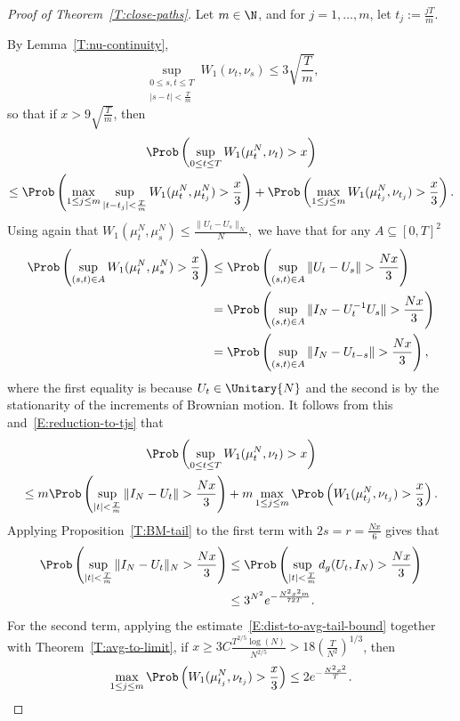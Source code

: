 \begin{proof}[Proof of Theorem~\ref{T:close-paths}]
Let $m\in\N$, and for $j=1,\ldots,m$, let $t_j:=\frac{jT}{m}$.



By Lemma~\ref{T:nu-continuity},
\[
\sup_{\substack{0\le s,t\le T\\
|s-t|<\frac{T}{m}}}W_1(\nu_t,\nu_s)\le 3\sqrt{\frac{T}{m}},
\]
so that if $x>9\sqrt{\frac{T}{m}}$, then
\begin{multline}\label{E:reduction-to-tjs}
\Prob\left(\sup_{0\le t\le T}W_1(\mu^N_t,\nu_t)>x\right)\\
\le \Prob\left(\max_{1\le j\le m}\sup_{|t-t_j|<\frac{T}{m}}W_1(\mu^N_t,\mu^N_{t_j})>\frac{x}{3}\right)+\Prob\left(\max_{1\le j\le m}W_1(\mu^N_{t_j},\nu_{t_j})>\frac{x}{3}\right).
\end{multline}
Using again that $W_1(\mu^N_t,\mu^N_s)\le\frac{\|U_t-U_s\|_N}{N},$ we have that for any $A\subseteq[0,T]^2$
\begin{align*}
\Prob\left(\sup_{(s,t)\in A}W_1(\mu^N_t,\mu^N_s)>\frac{x}{3}\right) &\le\Prob\left(\sup_{(s,t)\in A}\|U_t-U_s\|>\frac{Nx}{3}\right)\\
&=\Prob\left(\sup_{(s,t)\in A}\|I_N-U_t^{-1}U_s\|>\frac{Nx}{3}\right) \\
&=\Prob\left(\sup_{(s,t)\in A}\|I_N-U_{t-s}\|>\frac{Nx}{3}\right),
\end{align*}
where the first equality is because $U_t\in\Unitary{N}$ and the second is by the stationarity of the increments of Brownian motion. It follows from this and~\eqref{E:reduction-to-tjs} that
\begin{multline*}
\Prob\left(\sup_{0\le t\le
T}W_1(\mu^N_t,\nu_t)>x\right) \\
\le m\Prob\left(\sup_{|t|<\frac{T}{m}}\|I_N-U_t\|>\frac{Nx}{3}\right)+m\max_{1\le j\le m}\Prob\left(W_1(\mu^N_{t_j},\nu_{t_j})>\frac{x}{3}\right).
\end{multline*}
Applying Proposition~\ref{T:BM-tail} to the first term with $2s=r=\frac{Nx}{6}$ gives that
\begin{align*}
\Prob\left(\sup_{|t|<\frac{T}{m}}\|I_N-U_t\|_N>\frac{Nx}{3}\right) &\le \Prob\left(\sup_{|t|<\frac{T}{m}}d_g(U_t,I_N)>\frac{Nx}{3}\right) \\
&\le 3^{N^2}e^{-\frac{N^2x^2m}{72T}}.
\end{align*}
For the second term, applying the estimate~\eqref{E:dist-to-avg-tail-bound} together with Theorem~\ref{T:avg-to-limit}, if $x\ge 3C\frac{T^{2/5}\log(N)}{N^{2/5}}> 18\left(\frac{T}{N^2}\right)^{1/3}$, then
\[
\max_{1\le j\le m}\Prob\left(W_1(\mu^N_{t_j},\nu_{t_j})>\frac{x}{3}\right) \le 2e^{-\frac{N^2x^2}{T}}.
\]


\end{proof}
